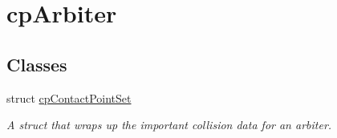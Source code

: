 \hypertarget{group__cp_arbiter}{}\section{cp\+Arbiter}
\label{group__cp_arbiter}
\subsection*{Classes}
\begin{DoxyCompactItemize}
\item 
struct \mbox{\hyperlink{structcp_contact_point_set}{cp\+Contact\+Point\+Set}}
\begin{DoxyCompactList}\small\item\em A struct that wraps up the important collision data for an arbiter. \end{DoxyCompactList}\end{DoxyCompactItemize}
